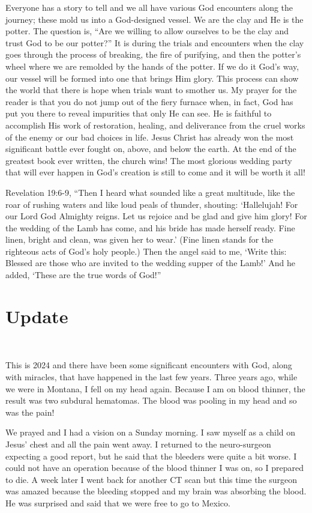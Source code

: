 \documentclass[twoside, 12pt]{book}
\begin{document}
Everyone has a story to tell and we all have various God encounters along the journey; these mold us into a God-designed vessel. We are the clay and He is the potter. The question is, “Are we willing to allow ourselves to be the clay and trust God to be our potter?” It is during the trials and encounters when the clay goes through the process of breaking, the fire of purifying, and then the potter’s wheel where we are remolded by the hands of the potter. If we do it God’s way, our vessel will be formed into one that brings Him glory. This process can show the world that there is hope when trials want to smother us. My prayer for the reader is that you do not jump out of the fiery furnace when, in fact, God has put you there to reveal impurities that only He can see. He is faithful to accomplish His work of restoration, healing, and deliverance from the cruel works of the enemy or our bad choices in life. Jesus Christ has already won the most significant battle ever fought on, above, and below the earth. At the end of the greatest book ever written, the church wins! The most glorious wedding party that will ever happen in God’s creation is still to come and it will be worth it all! 

Revelation 19:6-9, “Then I heard what sounded like a great multitude, like the roar of rushing waters and like loud peals of thunder, shouting: ‘Hallelujah! For our Lord God Almighty reigns. Let us rejoice and be glad and give him glory! For the wedding of the Lamb has come, and his bride has made herself ready. Fine linen, bright and clean, was given her to wear.’ (Fine linen stands for the righteous acts of God’s holy people.) Then the angel said to me, ‘Write this: Blessed are those who are invited to the wedding supper of the Lamb!’ And he added, ‘These are the true words of God!”

\clearpage
\section{Update}
\

This is 2024 and there have been some significant encounters with God, along with miracles, that have happened in the last few years. Three years ago, while we were in Montana, I fell on my head again. Because I am on blood thinner, the result was two subdural hematomas. The blood was pooling in my head and so was the pain!

We prayed and I had a vision on a Sunday morning. I saw myself as a child on Jesus’ chest and all the pain went away. I returned to the neuro-surgeon expecting a good report, but he said that the bleeders were quite a bit worse. I could not have an operation because of the blood thinner I was on, so I prepared to die. A week later I went back for another CT scan but this time the surgeon was amazed because the bleeding stopped and my brain was absorbing the blood. He was surprised and said that we were free to go to Mexico.
\end{document}
